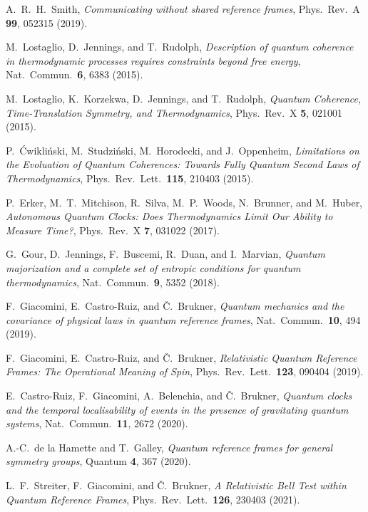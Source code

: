 \documentclass[aps,10pt,twocolumn,showpacs,pra,citeautoscript,amsmath,amssymb,floatfix,superscriptaddress]{revtex4-1}
\begin{document}
\begin{thebibliography}{47}
A.\ R.\ H.\ Smith, \emph{Communicating without shared reference frames}, Phys.\ Rev.\ A \textbf{99}, 052315 (2019).

M.\ Lostaglio, D.\ Jennings, and T.\ Rudolph, \emph{Description of quantum coherence in thermodynamic processes requires constraints beyond free energy}, Nat.\ Commun.\ \textbf{6}, 6383 (2015).

M.\ Lostaglio, K.\ Korzekwa, D.\ Jennings, and T.\ Rudolph, \emph{Quantum Coherence, Time-Translation Symmetry, and Thermodynamics}, Phys.\ Rev.\ X \textbf{5}, 021001 (2015).

P.\ \'Cwikli\'nski, M.\ Studzi\'nski, M.\ Horodecki, and J.\ Oppenheim, \emph{Limitations on the Evoluation of Quantum Coherences: Towards Fully Quantum Second Laws of Thermodynamics}, Phys.\ Rev.\ Lett.\ \textbf{115}, 210403 (2015).

P.\ Erker, M.\ T.\ Mitchison, R.\ Silva, M.\ P.\ Woods, N.\ Brunner, and M.\ Huber, \emph{Autonomous Quantum Clocks: Does Thermodynamics Limit Our Ability to Measure Time?}, Phys.\ Rev.\ X \textbf{7}, 031022 (2017).

G.\ Gour, D.\ Jennings, F.\ Buscemi, R.\ Duan, and I.\ Marvian, \emph{Quantum majorization and a complete set of entropic conditions for quantum thermodynamics}, Nat.\ Commun.\ \textbf{9}, 5352 (2018).

F.\ Giacomini, E.\ Castro-Ruiz, and \v{C}.\ Brukner, \emph{Quantum mechanics and the covariance of physical laws in quantum reference frames}, Nat.\ Commun.\ \textbf{10}, 494 (2019).

F.\ Giacomini, E.\ Castro-Ruiz, and \v{C}.\ Brukner, \emph{Relativistic Quantum Reference Frames: The Operational Meaning of Spin}, Phys.\ Rev.\ Lett.\ \textbf{123}, 090404 (2019).

E.\ Castro-Ruiz, F.\ Giacomini, A.\ Belenchia, and \v{C}.\ Brukner, \emph{Quantum clocks and the temporal localisability of events in the presence of gravitating quantum systems}, Nat.\ Commun.\ \textbf{11}, 2672 (2020).

A.-C.\ de la Hamette and T.\ Galley, \emph{Quantum reference frames for general symmetry groups}, Quantum \textbf{4}, 367 (2020).

L.\ F.\ Streiter, F.\ Giacomini, and \v{C}.\ Brukner, \emph{A Relativistic Bell Test within Quantum Reference Frames}, Phys.\ Rev.\ Lett.\ \textbf{126}, 230403 (2021).


\end{thebibliography}
\end{document}
